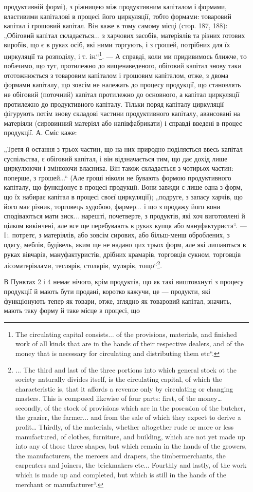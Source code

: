 продуктивній формі), з ріжницею між продуктивним капіталом і формами,
властивими капіталові в процесі його циркуляції, тобто формами: товаровий
капітал і грошовий капітал. Він каже в тому самому місці (стор.
187, 188): „Обіговий капітал складається... з харчових засобів, матеріялів
та різних готових виробів, що є в руках осіб, які ними торгують, і з
грошей, потрібних для їх циркуляції та розподілу, і т. ін.“\footnote*{
The circulating capital consists... of the provisions, materials, and finished work
of all kinds that are in the hands of their respective dealers, and of the money
that is necessary for circulating and distributing them etc“.
}. — А справді,
коли ми придивимось ближче, то побачимо, що тут, протилежно до вищенаведеного,
обіговий капітал знову таки ототожнюється з товаровим
капіталом і грошовим капіталом, отже, з двома формами капіталу, що зовсім
не належать до процесу продукції, що становлять не обіговий (поточний)
капітал протилежно до основного, а капітал циркуляції протилежно до продуктивного
капіталу. Тільки поряд капіталу циркуляції фігурують потім
знову складові частини продуктивного капіталу, авансовані на матеріяли
(сировинний матеріял або напівфабрикати) і справді введені в процес продукції.
А. Сміс каже:

„Третя й остання з трьох частин, що на них природно поділяється
ввесь капітал суспільства, є обіговий капітал, і він відзначається тим, що
дає дохід лише циркулюючи і змінюючи власника. Він також складається
з чотирьох частин: поперше, з грошей...“ (Але гроші ніколи не
бувають формою продуктивного капіталу, що функціонує в процесі продукції.
Вони завжди є лише одна з форм, що їх набирає капітал в процесі
своєї циркуляції); „подруге, з запасу харчів, що його має різник,
торговець худобою, фармер... і що з продажу його вони сподіваються
мати зиск... нарешті, почетверте, з продуктів, які хоч виготовлені й цілком
викінчені, але все ще перебувають в руках купця або мануфактуриста“.
— І:. потретє, з матеріялів, або зовсім сирових, або більш-менш
оброблених, з одягу, меблів, будівель, яким ще не надано цих трьох
форм, але які лишаються в руках вівчарів, мануфактуристів, дрібних
крамарів, торговців сукном, торговців лісоматеріялами, теслярів, столярів,
мулярів, тощо“\footnote*{
... The third and last of the three portions into which general stock ot the
society naturally divides itself, is the circulating capital, of which the characteristic
is, that it affords a revenue only by circulating or changing masters. This is
composed likewise of four parts: first, of the money… secondly, of the stock of
provisions which are in the posession of the butcher, the grazier, the farmer... and
from the sale of which they expect to derive a profit… Thirdly, of the materials,
whether altogether rude or more or less manufactured, of clothes, furniture, and
building, which are not yet made up into any of those three shapes, but which remain
in the hands of the growers, the manufacturers, the mercers and drapers, the timbermerchants, the
carpenters and joiners, the brickmakers etc... Fourthly and lastly, of
the work which is made up and completed, but which is still in the hands of the
merchant or manufacturer“.
}.

В Пунктах 2 і 4 немає нічого, крім продуктів, що як такі виштовхнуті
з процесу продукції й мають бути продані, коротко кажучи,
це — продукти, які функціонують тепер як товари, отже, зглядно як товаровий
капітал, значить, мають таку форму й таке місце в процесі, що